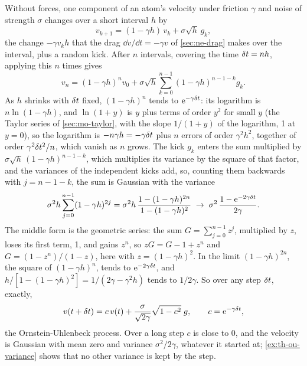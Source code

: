 Without forces, one component of an atom's velocity under friction $\gamma$
and noise of strength $\sigma$ changes over a short interval $h$ by
\begin{equation*}
   v_{k+1} = (1 - \gamma h)\,v_k + \sigma\sqrt h\,g_k ,
\end{equation*}
the change $-\gamma v_kh$ that the drag $\dd v/\dd t = -\gamma v$ of
\cref{sec:ne-drag} makes over the interval, plus a random kick. After $n$ intervals,
covering the time $\delta t = nh$, applying this $n$ times gives
\begin{equation*}
   v_n = (1 - \gamma h)^nv_0 + \sigma\sqrt h\sum_{k=0}^{n-1}(1 - \gamma
   h)^{n-1-k}g_k .
\end{equation*}
As $h$ shrinks with $\delta t$ fixed, $(1 - \gamma h)^n$ tends to
$\mathrm{e}^{-\gamma\delta t}$: its logarithm is $n\ln(1 - \gamma h)$, and
$\ln(1 + y)$ is $y$ plus terms of order $y^2$ for small $y$ (the Taylor
series of \cref{sec:mo-taylor}, with the slope $1/(1 + y)$ of the
logarithm, 1 at $y = 0$), so the logarithm is $-n\gamma h = -\gamma\delta t$
plus $n$ errors of order $\gamma^2h^2$, together of order
$\gamma^2\delta t^2/n$, which vanish as $n$ grows. The kick $g_k$ enters the sum
multiplied by $\sigma\sqrt h\,(1 - \gamma h)^{n-1-k}$, which multiplies its
variance by the square of that factor, and the variances of the
independent kicks add, so, counting them backwards with $j = n - 1 - k$,
the sum is Gaussian with the variance
\begin{equation*}
   \sigma^2h\sum_{j=0}^{n-1}(1 - \gamma h)^{2j}
   = \sigma^2h\,\frac{1 - (1 - \gamma h)^{2n}}{1 - (1 - \gamma h)^2}
   \;\to\; \sigma^2\,\frac{1 - \mathrm{e}^{-2\gamma\delta t}}{2\gamma} .
\end{equation*}
The middle form is the geometric series: the sum $G =
\sum_{j=0}^{n-1}z^j$, multiplied by $z$, loses its first term, 1, and
gains $z^n$, so $zG = G - 1 + z^n$ and $G = (1 - z^n)/(1 - z)$, here with
$z = (1 - \gamma h)^2$. In
the limit $(1 - \gamma h)^{2n}$, the square of $(1 - \gamma h)^n$, tends to
$\mathrm{e}^{-2\gamma\delta t}$, and $h/[1 - (1 - \gamma h)^2] = 1/(2\gamma -
\gamma^2h)$ tends to $1/2\gamma$. So over any step $\delta t$, exactly,
\begin{equation}
   v(t + \delta t) = c\,v(t) + \frac{\sigma}{\sqrt{2\gamma}}\sqrt{1 - c^2}\;g ,
   \qquad c = \mathrm{e}^{-\gamma\delta t} ,
   \label{eq:th-ou}
\end{equation}
the Ornstein-Uhlenbeck process\cite{Uhlenbeck1930}. Over a long step $c$
is close to 0, and the velocity is Gaussian with mean zero and variance
$\sigma^2/2\gamma$, whatever it started at; \cref{ex:th-ou-variance} shows
that no other variance is kept by the step.

